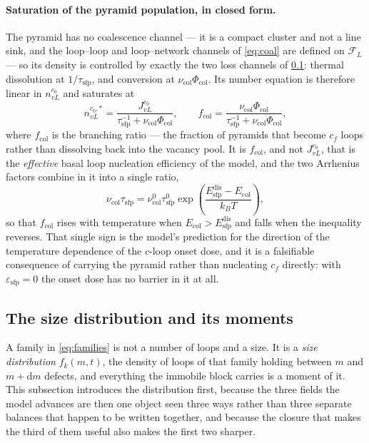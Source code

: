 \documentclass{article}
\begin{document}
\paragraph{Saturation of the pyramid population, in closed form.} The pyramid has
no coalescence channel --- it is a compact cluster and not a line sink, and the
loop--loop and loop--network channels of \cref{eq:coal} are defined on
$\mathcal F_L$ --- so its density is controlled by exactly the two loss channels
of \cref{sec:number}: thermal dissolution at $1/\tau_{\mathrm{sfp}}$, and
conversion at $\nu_{\mathrm{col}}\Phi_{\mathrm{col}}$. Its number equation is
therefore linear in $n^{c_0}_{vL}$ and saturates at
\begin{equation}
  n^{c_0,\ast}_{vL}
  =\frac{J^{c_0}_{vL}}{\tau_{\mathrm{sfp}}^{-1}+\nu_{\mathrm{col}}\Phi_{\mathrm{col}}},
  \qquad
  f_{\mathrm{col}}
  =\frac{\nu_{\mathrm{col}}\Phi_{\mathrm{col}}}
        {\tau_{\mathrm{sfp}}^{-1}+\nu_{\mathrm{col}}\Phi_{\mathrm{col}}},
  \label{eq:sfp-saturation}
\end{equation}
where $f_{\mathrm{col}}$ is the branching ratio --- the fraction of pyramids that
become $c_f$ loops rather than dissolving back into the vacancy pool. It is
$f_{\mathrm{col}}$, and not $J^{c_0}_{vL}$, that is the \emph{effective} basal
loop nucleation efficiency of the model, and the two Arrhenius factors combine in
it into a single ratio,
\begin{equation}
  \nu_{\mathrm{col}}\tau_{\mathrm{sfp}}
  =\nu^0_{\mathrm{col}}\tau^0_{\mathrm{sfp}}
   \exp\!\left(\frac{E^{\mathrm{dis}}_{\mathrm{sfp}}-E_{\mathrm{col}}}{k_BT}\right),
  \label{eq:branching}
\end{equation}
so that $f_{\mathrm{col}}$ rises with temperature when
$E_{\mathrm{col}}>E^{\mathrm{dis}}_{\mathrm{sfp}}$ and falls when the inequality
reverses. That single sign is the model's prediction for the direction of the
temperature dependence of the $c$-loop onset dose, and it is a falsifiable
consequence of carrying the pyramid rather than nucleating $c_f$ directly: with
$\varepsilon_{\mathrm{sfp}}=0$ the onset dose has no barrier in it at all.

\subsection{The size distribution and its moments}
\label{sec:number}
\label{sec:moments}

A family in \cref{eq:families} is not a number of loops and a size. It is a
\emph{size distribution} $f_k(m,t)$, the density of loops of that family holding
between $m$ and $m+\mathrm dm$ defects, and everything the immobile block carries
is a moment of it. This subsection introduces the distribution first, because the
three fields the model advances are then one object seen three ways rather than
three separate balances that happen to be written together, and because the
closure that makes the third of them useful also makes the first two sharper.
\end{document}
